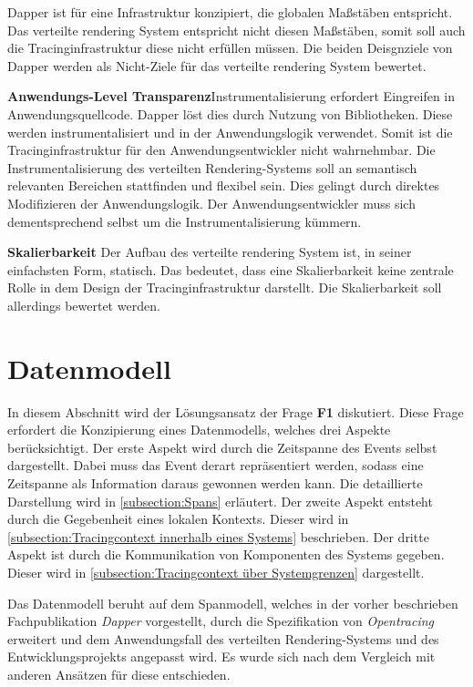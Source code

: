 Dapper ist für eine Infrastruktur konzipiert, die globalen  Maßstäben entspricht. Das verteilte rendering System entspricht nicht diesen Maßstäben, somit soll auch die Tracinginfrastruktur diese nicht erfüllen müssen. Die beiden Deisgnziele von Dapper werden als Nicht-Ziele für das verteilte rendering System bewertet.

\textbf{Anwendungs-Level Transparenz}\space\space\space Instrumentalisierung erfordert Eingreifen in Anwendungsquellcode. Dapper löst dies durch Nutzung von Bibliotheken. Diese werden instrumentalisiert und in der Anwendungslogik verwendet. Somit ist die Tracinginfrastruktur für den Anwendungsentwickler nicht wahrnehmbar. Die Instrumentalisierung des verteilten Rendering-Systems soll an semantisch relevanten Bereichen stattfinden und flexibel sein. Dies gelingt durch direktes Modifizieren der Anwendungslogik. Der Anwendungsentwickler muss sich dementsprechend selbst um die Instrumentalisierung kümmern. 

\textbf{Skalierbarkeit} \space\space\space Der Aufbau des verteilte rendering System ist, in seiner einfachsten Form, statisch. Das bedeutet, dass eine Skalierbarkeit keine zentrale Rolle in dem Design der Tracinginfrastruktur darstellt. Die Skalierbarkeit soll allerdings bewertet werden. 

\section{Datenmodell}
\label{section:Datenmodell}

In diesem Abschnitt wird der Lösungsansatz der Frage \textbf{F1} diskutiert.
Diese Frage erfordert die Konzipierung eines Datenmodells, welches drei Aspekte berücksichtigt. Der erste Aspekt wird durch die Zeitspanne des Events selbst dargestellt. Dabei muss das Event derart repräsentiert werden, sodass eine Zeitspanne als Information daraus gewonnen werden kann. Die detaillierte Darstellung wird in \cref{subsection:Spans} erläutert. Der zweite Aspekt entsteht durch die Gegebenheit eines lokalen Kontexts. Dieser wird in \cref{subsection:Tracingcontext innerhalb eines Systems} beschrieben. Der dritte Aspekt ist durch die Kommunikation von Komponenten des Systems gegeben. Dieser wird  in \cref{subsection:Tracingcontext über Systemgrenzen} dargestellt.


Das Datenmodell beruht auf dem Spanmodell, welches in der vorher beschrieben Fachpublikation \emph{Dapper} vorgestellt, durch die Spezifikation von \emph{Opentracing} erweitert und dem Anwendungsfall des verteilten Rendering-Systems und des Entwicklungsprojekts angepasst wird. Es wurde sich nach dem Vergleich mit anderen Ansätzen für diese entschieden.

